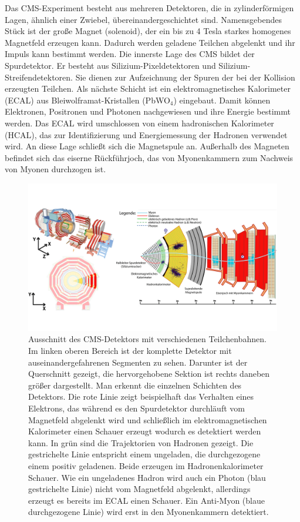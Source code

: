 Das CMS-Experiment besteht aus mehreren Detektoren, die in zylinderf\"ormigen Lagen, \"ahnlich einer Zwiebel, \"ubereinandergeschichtet sind. Namensgebendes St\"uck ist der gro\ss e Magnet (solenoid), der ein bis zu \num{4} Tesla starkes homogenes Magnetfeld erzeugen kann. Dadurch werden geladene Teilchen abgelenkt und ihr Impuls kann bestimmt werden. Die innerste Lage des CMS bildet der Spurdetektor. Er besteht aus Silizium-Pixeldetektoren und Silizium-Streifendetektoren. Sie dienen zur Aufzeichnung der Spuren der bei der Kollision erzeugten Teilchen. Als n\"achste Schicht ist ein elektromagnetisches Kalorimeter (ECAL) aus Bleiwolframat-Kristallen (PbWO$_4$) eingebaut. Damit k\"onnen Elektronen, Positronen und Photonen nachgewiesen und ihre Energie bestimmt werden. Das ECAL wird umschlossen von einem hadronischen Kalorimeter (HCAL), das zur Identifizierung und Energiemessung der Hadronen verwendet wird. An diese Lage schlie\ss t sich die Magnetspule an. Au\ss erhalb des Magneten befindet sich das eiserne R\"uckf\"uhrjoch, das von Myonenkammern zum Nachweis von Myonen durchzogen ist.\\

\begin{figure}[tbp]
 \begin{center}
   \includegraphics[width=\textwidth]{graphics/cms_slice.png}
   \parbox[b]{12cm}{
     \caption[CMS-Detektor]
             {\label{fig:cms_slice}Ausschnitt des CMS-Detektors mit verschiedenen Teilchenbahnen. Im linken oberen Bereich ist der komplette Detektor mit auseinandergefahrenen Segmenten zu sehen. Darunter ist der Querschnitt gezeigt, die hervorgehobene Sektion ist rechts daneben gr\"o\ss er dargestellt. Man erkennt die einzelnen Schichten des Detektors. Die rote Linie zeigt beispielhaft das Verhalten eines Elektrons, das w\"ahrend es den Spurdetektor durchl\"auft vom Magnetfeld abgelenkt wird und schlie\ss lich im elektromagnetischen Kalorimeter einen Schauer erzeugt wodurch es detektiert werden kann. In gr\"un sind die Trajektorien von Hadronen gezeigt. Die gestrichelte Linie entspricht einem ungeladen, die durchgezogene einem positiv geladenen. Beide erzeugen im Hadronenkalorimeter Schauer. Wie ein ungeladenes Hadron wird auch ein Photon (blau gestrichelte Linie) nicht vom Magnetfeld abgelenkt, allerdings erzeugt es bereits im ECAL einen Schauer. Ein Anti-Myon (blaue durchgezogene Linie) wird erst in den Myonenkammern detektiert.\cite{cms_slice}}
   }
 \end{center}
\end{figure}

